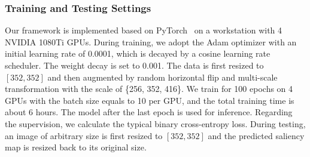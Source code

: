 \documentclass[letterpaper]{article}
\begin{document}
\subsubsection{Training and Testing Settings}
Our framework is implemented based on PyTorch~\cite{paszke2019pytorch} on a workstation with 4 NVIDIA 1080Ti GPUs. During training, we adopt the Adam optimizer with an initial learning rate of 0.0001, which is decayed by a cosine learning rate scheduler. The weight decay is set to 0.001. The data is first resized to $[352, 352]$ and then augmented by random horizontal flip and multi-scale transformation with the scale of \{256, 352, 416\}. We train for 100 epochs on 4 GPUs with the batch size equals to 10 per GPU, and the total training time is about 6 hours. The model after the last epoch is used for inference. Regarding the supervision, we calculate the typical binary cross-entropy loss. During testing, an image of arbitrary size is first resized to $[352, 352]$ and the predicted saliency map is resized back to its original size.
\end{document}
